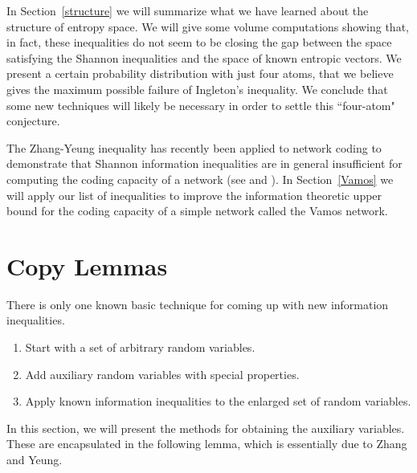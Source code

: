 \documentclass[10pt,journal]{IEEEtran}
\begin{document}
In Section~\ref{structure} we will summarize what we have learned about the structure of entropy space.
We will give some volume computations showing that, in fact, these inequalities do not
seem to be closing the gap between the space satisfying the Shannon inequalities and the
space of known entropic vectors.  We present a certain probability distribution with just four atoms, that
we believe gives the maximum possible failure of
Ingleton's inequality.  We conclude that some new techniques will likely be necessary
in order to settle this ``four-atom" conjecture.

The Zhang-Yeung inequality has recently been applied to network coding
to demonstrate that Shannon information inequalities are in general insufficient
for computing the coding capacity of a network
(see \cite{Dougherty-Freiling-Zeger06-Matroids} and \cite{ChanGrant}).
In Section~\ref{Vamos} we will apply our list of inequalities to improve the information
theoretic upper bound for the coding capacity of a simple network called the Vamos network.



\section{Copy Lemmas}\label{sec:Copy}

There is only one known basic technique for coming up with new information inequalities.
\begin{enumerate}
\item Start with a set of arbitrary random variables.
\item Add auxiliary random variables
with special properties.
\item Apply known information inequalities to the enlarged set of random variables.
\end{enumerate}
In this section, we will present the methods for obtaining the auxiliary variables.
These are encapsulated in the following lemma, which is essentially due to Zhang and Yeung.

\end{document}
